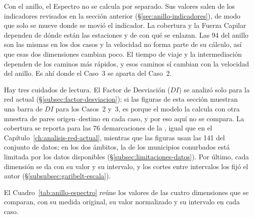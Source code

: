 Con el anillo, el Espectro no se calcula por separado. Sus valores salen de los
indicadores revisados en la sección anterior (§\ref{sec:anillo-indicadores}),
de modo que solo se mueve donde se movió el indicador. La cobertura y la Fuerza
Capilar dependen de dónde están las estaciones y de con qué se enlazan. Las 94
del anillo son las mismas en los dos casos y la velocidad no forma parte de su
cálculo, así que esas dos dimensiones cambian poco. El tiempo de viaje y la
intermediación dependen de los caminos más rápidos, y esos caminos sí cambian
con la velocidad del anillo. Es ahí donde el Caso~3 se aparta del Caso~2.

Hay tres cuidados de lectura. El Factor de Desviación ($DI$) se analizó solo
para la red actual (§\ref{subsec:factor-desviacion}); si las figuras de esta
sección muestran una barra de $DI$ para los Casos~2 y~3, es porque el modelo la
calcula con otra muestra de pares origen--destino en cada caso, y por eso aquí
no se compara. La cobertura se reporta para las 76 demarcaciones de la
\zmvm{}, igual que en el Capítulo~\ref{ch:analisis-red-actual}, mientras que
las figuras usan las 141 del conjunto de datos; en los dos ámbitos, la de los
municipios conurbados está limitada por los datos disponibles
(§\ref{subsec:limitaciones-datos}). Por último, cada dimensión se da
con su valor y su intervalo, y los cortes entre intervalos los fijó el autor
(§\ref{subsubsec:garibelt-escala}).

El Cuadro~\ref{tab:anillo-espectro} reúne los valores de las cuatro dimensiones
que se comparan, con su medida original, su valor normalizado y su intervalo
en cada caso.

